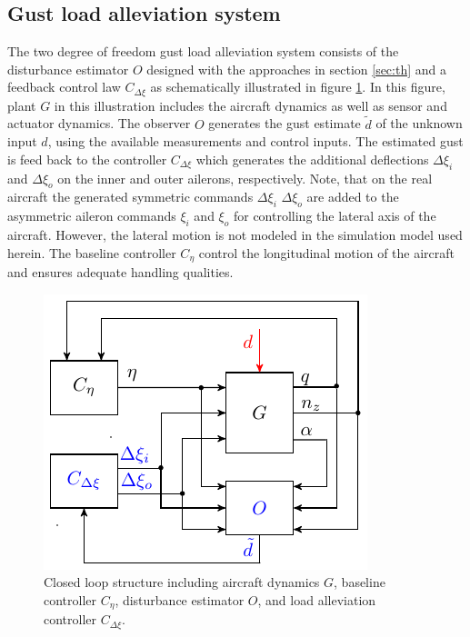 \documentclass[graybox]{svmult}
\begin{document}
\subsection{Gust load alleviation system}\label{APPsubsec:sys}
The two degree of freedom gust load alleviation system consists of the disturbance estimator $O$ designed with the approaches in section \ref{sec:th} and a feedback control law $C_{\Delta\xi}$ as schematically illustrated in figure \ref{fig:cl}. In this figure, plant $G$ in this illustration  includes the aircraft dynamics as well as sensor and actuator dynamics. The observer $O$ generates the gust estimate $\tilde d$ of the unknown input $d$, using the available measurements and control inputs. The estimated gust is feed back to the controller $C_{\Delta\xi}$ which generates the additional  deflections  $\Delta \xi_i$  and $\Delta \xi_o$ on the inner and outer ailerons, respectively. Note, that on the real aircraft the generated symmetric commands $\Delta \xi_i$ $\Delta \xi_o$ are added to the asymmetric aileron commands  $\xi_i$  and $ \xi_o$ for controlling the lateral axis of the aircraft. However, the lateral motion is not modeled in the simulation model used herein. The baseline controller $C_\eta$ control the longitudinal motion of the aircraft and ensures adequate handling qualities.
 

\begin{figure}[h]
	\sidecaption[]
	\includegraphics{closedloop.pdf}
	\caption{Closed loop structure including aircraft dynamics $G$, baseline controller $C_\eta$, disturbance estimator $O$, and  load alleviation controller $C_{\Delta \xi}$. }
	\label{fig:cl}	
\end{figure}
\end{document}
